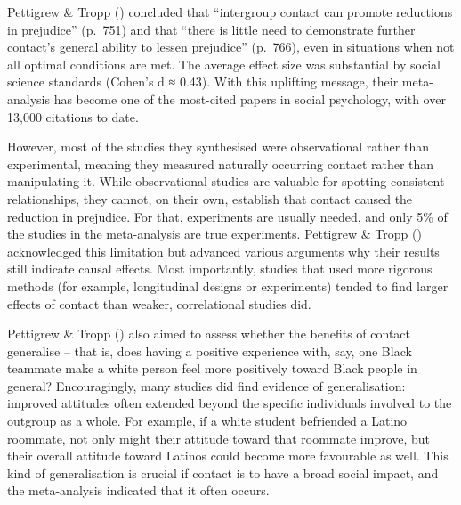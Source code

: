 \documentclass[
  letterpaper,
]{book}
\begin{document}
Pettigrew \& Tropp () concluded
that ``intergroup contact can promote reductions in prejudice'' (p.~751)
and that ``there is little need to demonstrate further contact's general
ability to lessen prejudice'' (p.~766), even in situations when not all
optimal conditions are met. The average effect size was substantial by
social science standards (Cohen's d ≈ 0.43). With this uplifting
message, their meta-analysis has become one of the most-cited papers in
social psychology, with over 13,000 citations to date.

However, most of the studies they synthesised were observational rather
than experimental, meaning they measured naturally occurring contact
rather than manipulating it. While observational studies are valuable
for spotting consistent relationships, they cannot, on their own,
establish that contact caused the reduction in prejudice. For that,
experiments are usually needed, and only 5\% of the studies in the
meta-analysis are true experiments. Pettigrew \& Tropp
() acknowledged this limitation
but advanced various arguments why their results still indicate causal
effects. Most importantly, studies that used more rigorous methods (for
example, longitudinal designs or experiments) tended to find larger
effects of contact than weaker, correlational studies did.

Pettigrew \& Tropp () also
aimed to assess whether the benefits of contact generalise -- that is,
does having a positive experience with, say, one Black teammate make a
white person feel more positively toward Black people in general?
Encouragingly, many studies did find evidence of generalisation:
improved attitudes often extended beyond the specific individuals
involved to the outgroup as a whole. For example, if a white student
befriended a Latino roommate, not only might their attitude toward that
roommate improve, but their overall attitude toward Latinos could become
more favourable as well. This kind of generalisation is crucial if
contact is to have a broad social impact, and the meta-analysis
indicated that it often occurs.
\end{document}
